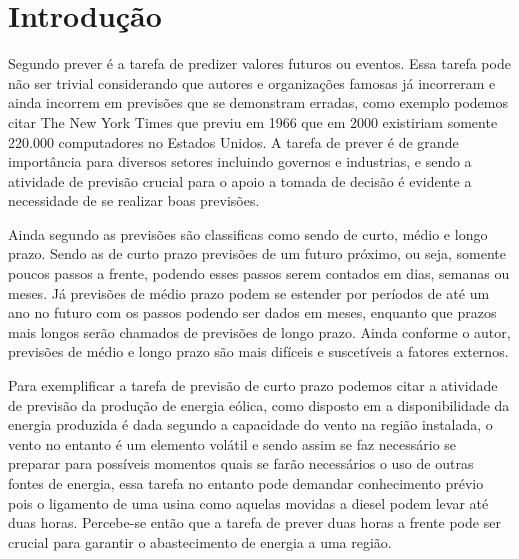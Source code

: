 \documentclass[
	12pt,
	oneside,
	a4paper,
	english,
	brazil
]{abntex2}
\begin{document}
\frenchspacing

\imprimircapa{}

\imprimirfolhaderosto{}

\textual{}

\tableofcontents*
\cleardoublepage{}

\chapter{Introdução}

Segundo  prever é a tarefa de predizer valores futuros ou 
eventos. Essa tarefa pode não ser trivial considerando que autores e 
organizações famosas já incorreram e ainda incorrem em previsões que se 
demonstram erradas, como exemplo podemos citar The New York Times que previu em 
1966 que em 2000 existiriam somente 220.000 computadores no Estados Unidos. A 
tarefa de prever é de grande importância para diversos setores incluindo 
governos e industrias, e sendo a atividade de previsão crucial para o apoio a 
tomada de decisão é evidente a necessidade de se realizar boas previsões.

Ainda segundo  as previsões são classificas como sendo de 
curto, médio e longo prazo.  Sendo as de curto prazo previsões de um futuro 
próximo, ou seja, somente poucos passos a frente, podendo esses passos serem 
contados em dias, semanas ou meses.  Já previsões de médio prazo podem se 
estender por períodos de até um ano no futuro com os passos podendo ser dados em 
meses, enquanto que prazos mais longos serão chamados de previsões de longo 
prazo. Ainda conforme o autor, previsões de médio e longo prazo são mais 
difíceis e suscetíveis a fatores externos.

Para exemplificar a tarefa de previsão de curto prazo podemos citar a atividade 
de previsão da produção de energia eólica, como disposto em 
 a disponibilidade da energia produzida é dada 
segundo a capacidade do vento na região instalada, o vento no entanto é um 
elemento volátil e sendo assim se faz necessário se preparar para possíveis 
momentos quais se farão necessários o uso de outras fontes de energia, essa 
tarefa no entanto pode demandar conhecimento prévio pois o ligamento de uma 
usina como aquelas movidas a diesel podem levar até duas horas. Percebe-se então 
que a tarefa de prever duas horas a frente pode ser crucial para garantir o 
abastecimento de energia a uma região.
\end{document}
